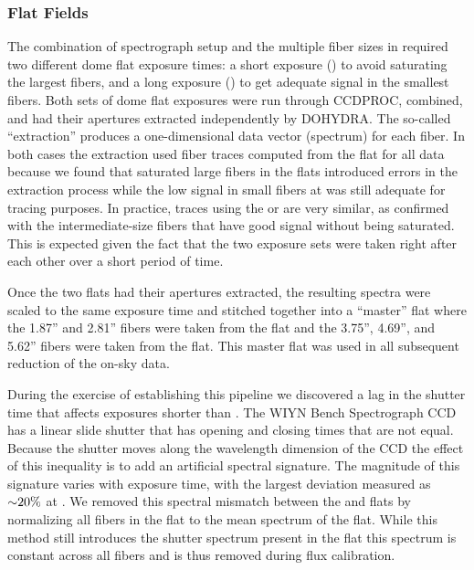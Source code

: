 \subsubsection{Flat Fields}
\label{sec:flats}

The combination of spectrograph setup and the multiple fiber sizes in
\GP required two different dome flat exposure times: a short exposure
() to avoid saturating the largest fibers, and a long
exposure () to get adequate signal in the smallest fibers.
Both sets of dome flat exposures were run through CCDPROC, combined,
and had their apertures extracted independently by DOHYDRA.  The
so-called ``extraction'' produces a one-dimensional data vector
(spectrum) for each fiber. In both cases the extraction used fiber
traces computed from the  flat for all data because we found
that saturated large fibers in the  flats introduced errors
in the extraction process while the low signal in small fibers at
 was still adequate for tracing purposes. In practice,
traces using the  or  are very similar, as
confirmed with the intermediate-size fibers that have good signal
without being saturated. This is expected given the fact that the two
exposure sets were taken right after each other over a short period of
time.

Once the two flats had their apertures extracted, the resulting
spectra were scaled to the same exposure time and stitched together
into a ``master'' flat where the 1.87'' and 2.81'' fibers were taken
from the  flat and the 3.75'', 4.69'', and 5.62'' fibers
were taken from the  flat. This master flat was used in all
subsequent reduction of the on-sky data.

During the exercise of establishing this pipeline we discovered a lag
in the shutter time that affects exposures shorter than . The WIYN Bench Spectrograph CCD has a linear slide shutter
that has opening and closing times that are not equal. Because the
shutter moves along the wavelength dimension of the CCD the effect of
this inequality is to add an artificial spectral signature. The
magnitude of this signature varies with exposure time, with the
largest deviation measured as ${\sim} 20\%$ at . We removed
this spectral mismatch between the  and  flats by
normalizing all fibers in the  flat to the mean spectrum of
the  flat. While this method still introduces the shutter
spectrum present in the  flat this spectrum is constant
across all fibers and is thus removed during flux calibration.

